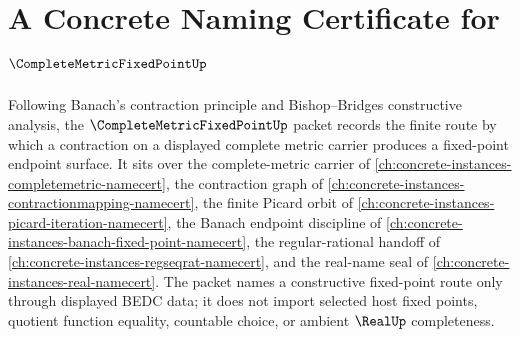 \chapter{A Concrete Naming Certificate for $\CompleteMetricFixedPointUp$}
\label{ch:concrete-instances-complete-metric-fixed-point-namecert}

Following Banach's contraction principle and Bishop--Bridges constructive analysis, the $\CompleteMetricFixedPointUp$ packet records the finite route by which a contraction on a displayed complete metric carrier produces a fixed-point endpoint surface. It sits over the complete-metric carrier of \autoref{ch:concrete-instances-completemetric-namecert}, the contraction graph of \autoref{ch:concrete-instances-contractionmapping-namecert}, the finite Picard orbit of \autoref{ch:concrete-instances-picard-iteration-namecert}, the Banach endpoint discipline of \autoref{ch:concrete-instances-banach-fixed-point-namecert}, the regular-rational handoff of \autoref{ch:concrete-instances-regseqrat-namecert}, and the real-name seal of \autoref{ch:concrete-instances-real-namecert}. The packet names a constructive fixed-point route only through displayed BEDC data; it does not import selected host fixed points, quotient function equality, countable choice, or ambient $\RealUp$ completeness.

